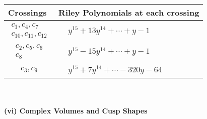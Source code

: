\documentclass[1p]{elsarticle_modified}
\theoremstyle{definition}
\begin{document}
\begin{tabular}{m{50pt}|m{274pt}}
Crossings & \hspace{64pt}Riley Polynomials at each crossing \\
\hline $$\begin{aligned}c_{1},c_{4},c_{7}\\c_{10},c_{11},c_{12}\end{aligned}$$&$\begin{aligned}
&y^{15}+13 y^{14}+\cdots+y-1
\end{aligned}$\\
\hline $$\begin{aligned}c_{2},c_{5},c_{6}\\c_{8}\end{aligned}$$&$\begin{aligned}
&y^{15}-15 y^{14}+\cdots+y-1
\end{aligned}$\\
\hline $$\begin{aligned}c_{3},c_{9}\end{aligned}$$&$\begin{aligned}
&y^{15}+7 y^{14}+\cdots-320 y-64
\end{aligned}$\\
\hline
\end{tabular}\\~\\
\newpage\flushleft \textbf{(vi) Complex Volumes and Cusp Shapes}
\end{document}
